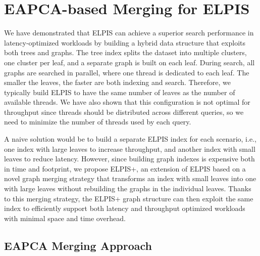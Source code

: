 \section{EAPCA-based Merging for ELPIS}
We have demonstrated that ELPIS can achieve a superior search performance in latency-optimized workloads by building a hybrid data structure that exploits both trees and graphs. The tree index splits the dataset into multiple clusters, one cluster per leaf, and a separate graph is built on each leaf. During search, all graphs are searched in parallel, where one thread is dedicated to each leaf. The smaller the leaves, the faster are both indexing and search. Therefore, we typically build ELPIS to have the same number of leaves as the number of available threads. We have also shown that this configuration is not optimal for throughput since threads should be distributed across different queries, so we need to minimize the number of threads used by each query. 

A naive solution would be to build a separate ELPIS index for each scenario, i.e., one index with large leaves to increase throughput, and another index with small leaves to reduce latency. However, since building graph indexes is expensive both in time and footprint, we propose ELPIS+, an extension of ELPIS based on a novel graph merging strategy that transforms an index with small leaves into one with large leaves without rebuilding the graphs in the individual leaves. Thanks to this merging strategy, the ELPIS+ graph structure can then exploit the same index to efficiently support both latency and throughput optimized workloads with minimal space and time overhead.




\subsection{EAPCA Merging Approach}

